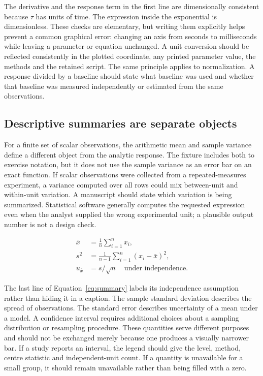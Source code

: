 The derivative and the response term in the first line are dimensionally consistent because $\tau$ has units of time. The expression inside the exponential is dimensionless. These checks are elementary, but writing them explicitly helps prevent a common graphical error: changing an axis from seconds to milliseconds while leaving a parameter or equation unchanged. A unit conversion should be reflected consistently in the plotted coordinate, any printed parameter value, the methods and the retained script. The same principle applies to normalization. A response divided by a baseline should state what baseline was used and whether that baseline was measured independently or estimated from the same observations.

\subsection{Descriptive summaries are separate objects}
For a finite set of scalar observations, the arithmetic mean and sample variance define a different object from the analytic response. The fixture includes both to exercise notation, but it does not use the sample variance as an error bar on an exact function. If scalar observations were collected from a repeated-measures experiment, a variance computed over all rows could mix between-unit and within-unit variation. A manuscript should state which variation is being summarized. Statistical software generally computes the requested expression even when the analyst supplied the wrong experimental unit; a plausible output number is not a design check.

\begin{equation}\begin{aligned}
\bar{x}&=\frac{1}{n}\sum_{i=1}^{n}x_i,\\
s^2&=\frac{1}{n-1}\sum_{i=1}^{n}(x_i-\bar{x})^2,\\
u_{\bar{x}}&=s/\sqrt{n}\quad\text{under independence}.
\end{aligned}\label{eq:summary}\end{equation}

The last line of Equation~\eqref{eq:summary} labels its independence assumption rather than hiding it in a caption. The sample standard deviation describes the spread of observations. The standard error describes uncertainty of a mean under a model. A confidence interval requires additional choices about a sampling distribution or resampling procedure. These quantities serve different purposes and should not be exchanged merely because one produces a visually narrower bar. If a study reports an interval, the legend should give the level, method, centre statistic and independent-unit count. If a quantity is unavailable for a small group, it should remain unavailable rather than being filled with a zero.


